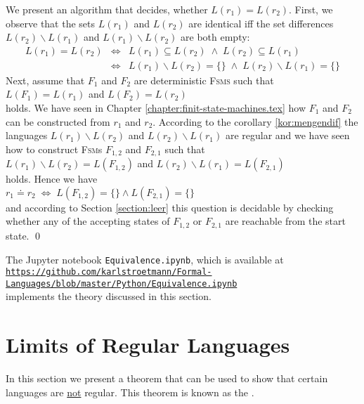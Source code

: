 \proofEng
We present an algorithm that decides, whether $L(r_1) = L(r_2)$.  First, we observe that the sets
$L(r_1)$ and $L(r_2)$ are identical iff the set differences $L(r_2) \backslash L(r_1)$ and $L(r_1) \backslash L(r_2)$
are both empty:
\begin{eqnarray*}
                  L(r_1) = L(r_2) 
&\Leftrightarrow& L(r_1) \subseteq L(r_2)         \;\wedge\; L(r_2) \subseteq L(r_1)          \\
&\Leftrightarrow& L(r_1) \backslash L(r_2) = \{\} \;\wedge\; L(r_2) \backslash L(r_1) = \{\}  
\end{eqnarray*}
Next, assume that $F_1$ and $F_2$ are deterministic \textsc{Fsms} such that
\\[0.2cm]
\hspace*{1.3cm}
$L(F_1) = L(r_1)$ \quad and \quad $L(F_2) = L(r_2)$
\\[0.2cm]
holds.  We have seen in Chapter \ref{chapter:finit-state-machines.tex} how $F_1$ and $F_2$ can be
constructed from $r_1$ and $r_2$. According to the corollary \ref{kor:mengendif} the languages
$L(r_1) \backslash L(r_2)$ and $L(r_2) \backslash L(r_1)$ are regular and we have seen how to
construct \textsc{Fsm}s $F_{1,2}$ and $F_{2,1}$ such that
\\[0.2cm]
\hspace*{1.3cm}
$L(r_1) \backslash L(r_2) = L(F_{1,2})$ \quad and \quad $L(r_2) \backslash L(r_1) = L(F_{2,1})$ 
\\[0.2cm]
holds.  Hence we have
\\[0.2cm]
\hspace*{1.3cm}
$r_1 \doteq r_2 \;\Leftrightarrow\; L(F_{1,2}) = \{\} \wedge  L(F_{2,1}) = \{\}$
\\[0.2cm]
and according to Section \ref{section:leer} this question is decidable by checking whether any of
the accepting states of $F_{1,2}$ or $F_{2,1}$ are reachable from the start state.
\qed

\remarkEng
The Jupyter notebook \texttt{Equivalence.ipynb}, which is available at
\\[0.2cm]
\hspace*{0.8cm}
\href{https://github.com/karlstroetmann/Formal-Languages/blob/master/Python/Equivalence.ipynb}{\texttt{https://github.com/karlstroetmann/Formal-Languages/blob/master/Python/Equivalence.ipynb}}
\\[0.2cm]
implements the theory discussed in this section.

\section{Limits of Regular Languages}
In this section we present a theorem that can be used to show that certain languages are
\underline{not} regular.  This theorem is known as the 
\href{https://en.wikipedia.org/wiki/Pumping_lemma_for_regular_languages}{}.

